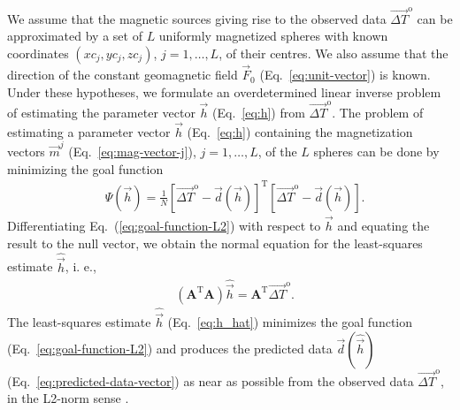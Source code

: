 \documentclass[journal abbreviation, npg]{copernicus}
\begin{document}
We assume that the magnetic sources giving rise to the observed data
$\vec{\Delta T}^\mathrm{o}$ can be approximated by a set of $L$ uniformly
magnetized spheres with known coordinates $(xc_{j}, yc_{j}, zc_{j})$, $j = 1,
\ldots, L$, of their centres. We also assume that the direction of the
constant geomagnetic field $\vec{F}_{0}$ (Eq.~\ref{eq:unit-vector}) is known.
Under these hypotheses, we formulate an overdetermined linear inverse problem 
of estimating
the parameter vector $\vec{h}$ (Eq.~\ref{eq:h}) from $\vec{\Delta
T}^\mathrm{o}$. The problem of estimating a parameter vector $\vec{h}$
(Eq.~\ref{eq:h}) containing the magnetization vectors $\vec{m}^{j}$
(Eq.~\ref{eq:mag-vector-j}), $j = 1, \ldots, L$, of the $L$ spheres can be
done by minimizing the goal function
\begin{align}
 &
\Psi(\vec{h}) = \frac{1}{N}[\vec{\Delta T}^\mathrm{o} - \vec{d}(\vec{h})]^{\mathrm{T}}[\vec{\Delta T}^\mathrm{o} - \vec{d}(\vec{h})] .
\label{eq:goal-function-L2}
\end{align}
Differentiating Eq.~(\ref{eq:goal-function-L2}) with respect to
$\vec{h}$ and equating the result to the null vector, we obtain the
normal equation for the least-squares estimate $\hat{\vec{h}}$, i. e.,
\begin{align}
 &
(\mathbf{A}^{\mathrm{T}}\mathbf{A})  \hat{\vec{h}} = \mathbf{A}^{\mathrm{T}}  \vec{\Delta T}^\mathrm{o} .
\label{eq:h_hat}
\end{align}
The least-squares estimate $\hat{\vec{h}}$ (Eq.~\ref{eq:h_hat}) minimizes the
goal function (Eq.~\ref{eq:goal-function-L2}) and produces the predicted data
$\vec{d}(\hat{\vec{h}})$ (Eq.~\ref{eq:predicted-data-vector}) as near as
possible from the observed data $\vec{\Delta T}^\mathrm{o}$, in the L2-norm
sense \citep{bard1973,twomey1977,menke1989,aster-etal2005}.
\end{document}
